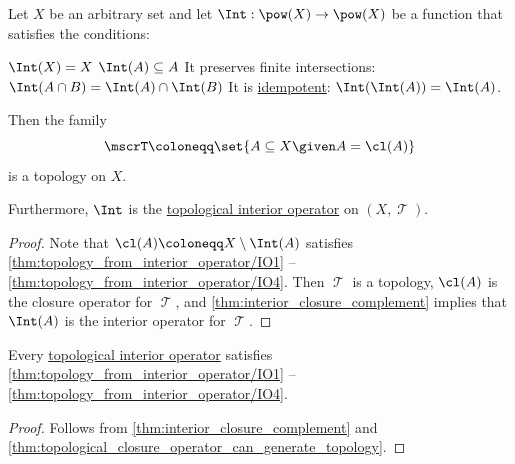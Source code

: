 \begin{proposition}\label{thm:topology_from_interior_operator}
  Let \( X \) be an arbitrary set and let \( \Int: \pow(X) \to \pow(X) \) be a function that satisfies the conditions:
  \begin{thmenum}
     \( \Int(X) = X \)
     \( \Int(A) \subseteq A \)
     It preserves finite intersections: \( \Int(A \cap B) = \Int(A) \cap \Int(B) \)
     It is \hyperref[def:binary_operation/idempotent]{idempotent}: \( \Int(\Int(A)) = \Int(A) \).
  \end{thmenum}

  Then the family
  \begin{equation*}
    \mscrT \coloneqq \set{ A \subseteq X \given A = \cl(A) }
  \end{equation*}
  is a topology on \( X \).

  Furthermore, \( \Int \) is the \hyperref[def:topological_interior_operator]{topological interior operator} on \( (X, \mscrT) \).
\end{proposition}
\begin{proof}
  Note that \( \cl(A) \coloneqq X \setminus \Int(A) \) satisfies \ref{thm:topology_from_interior_operator/IO1} -- \ref{thm:topology_from_interior_operator/IO4}. Then \( \mscrT \) is a topology, \( \cl(A) \) is the closure operator for \( \mscrT \), and \cref{thm:interior_closure_complement} implies that \( \Int(A) \) is the interior operator for \( \mscrT \).
\end{proof}

\begin{proposition}\label{thm:topological_interior_operator_can_generate_topology}
  Every \hyperref[def:topological_interior_operator]{topological interior operator} satisfies \ref{thm:topology_from_interior_operator/IO1} -- \ref{thm:topology_from_interior_operator/IO4}.
\end{proposition}
\begin{proof}
  Follows from \cref{thm:interior_closure_complement} and \cref{thm:topological_closure_operator_can_generate_topology}.
\end{proof}

